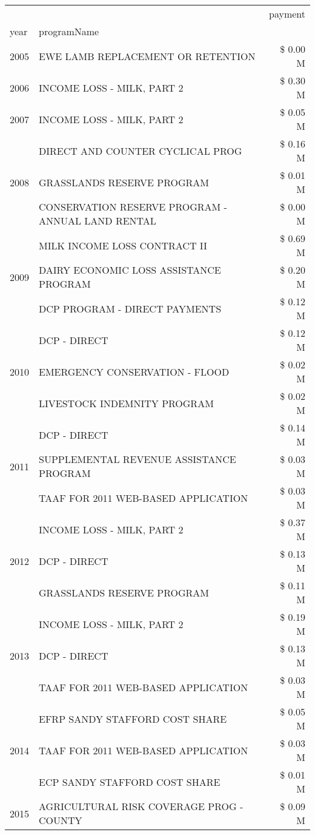 \begin{tabular}{llr}
\toprule
 &  & payment \\
year & programName &  \\
\midrule
2005 & EWE LAMB REPLACEMENT OR RETENTION & \$ 0.00 M \\
\cline{1-3}
2006 & INCOME LOSS - MILK, PART 2 & \$ 0.30 M \\
\cline{1-3}
2007 & INCOME LOSS - MILK, PART 2 & \$ 0.05 M \\
\cline{1-3}
\multirow[t]{3}{*}{2008} & DIRECT AND COUNTER CYCLICAL PROG & \$ 0.16 M \\
 & GRASSLANDS RESERVE PROGRAM & \$ 0.01 M \\
 & CONSERVATION RESERVE PROGRAM - ANNUAL LAND RENTAL & \$ 0.00 M \\
\cline{1-3}
\multirow[t]{3}{*}{2009} & MILK INCOME LOSS CONTRACT II & \$ 0.69 M \\
 & DAIRY ECONOMIC LOSS ASSISTANCE PROGRAM & \$ 0.20 M \\
 & DCP PROGRAM - DIRECT PAYMENTS & \$ 0.12 M \\
\cline{1-3}
\multirow[t]{3}{*}{2010} & DCP - DIRECT & \$ 0.12 M \\
 & EMERGENCY CONSERVATION - FLOOD & \$ 0.02 M \\
 & LIVESTOCK INDEMNITY PROGRAM & \$ 0.02 M \\
\cline{1-3}
\multirow[t]{3}{*}{2011} & DCP - DIRECT & \$ 0.14 M \\
 & SUPPLEMENTAL REVENUE ASSISTANCE PROGRAM & \$ 0.03 M \\
 & TAAF FOR 2011 WEB-BASED APPLICATION & \$ 0.03 M \\
\cline{1-3}
\multirow[t]{3}{*}{2012} & INCOME LOSS - MILK, PART 2 & \$ 0.37 M \\
 & DCP - DIRECT & \$ 0.13 M \\
 & GRASSLANDS RESERVE PROGRAM & \$ 0.11 M \\
\cline{1-3}
\multirow[t]{3}{*}{2013} & INCOME LOSS - MILK, PART 2 & \$ 0.19 M \\
 & DCP - DIRECT & \$ 0.13 M \\
 & TAAF FOR 2011 WEB-BASED APPLICATION & \$ 0.03 M \\
\cline{1-3}
\multirow[t]{3}{*}{2014} & EFRP SANDY STAFFORD COST SHARE & \$ 0.05 M \\
 & TAAF FOR 2011 WEB-BASED APPLICATION & \$ 0.03 M \\
 & ECP SANDY STAFFORD COST SHARE & \$ 0.01 M \\
\cline{1-3}
\multirow[t]{3}{*}{2015} & AGRICULTURAL RISK COVERAGE PROG - COUNTY & \$ 0.09 M \\

\end{tabular}
